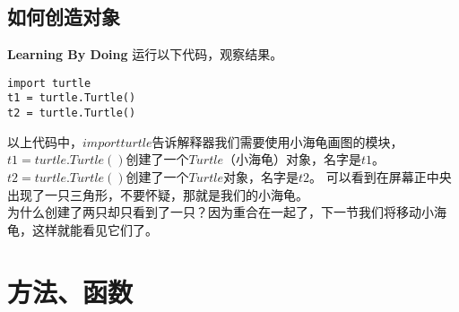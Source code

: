 \subsection{如何创造对象}
\begin{paperbox}{\textbf{Learning By Doing}\starfive}
运行以下代码，观察结果。
\begin{lstlisting}[style=PythonStyle1, caption=Rectangle]
import turtle
t1 = turtle.Turtle()
t2 = turtle.Turtle()
\end{lstlisting}
\end{paperbox}
以上代码中，$import turtle$告诉解释器我们需要使用小海龟画图的模块，
$t1 = turtle.Turtle()$创建了一个$Turtle$（小海龟）对象，名字是$t1$。
$t2 = turtle.Turtle()$创建了一个$Turtle$对象，名字是$t2$。
可以看到在屏幕正中央出现了一只三角形，不要怀疑，那就是我们的小海龟。\\
为什么创建了两只却只看到了一只？因为重合在一起了，下一节我们将移动小海龟，这样就能看见它们了。
\section{方法、函数}
